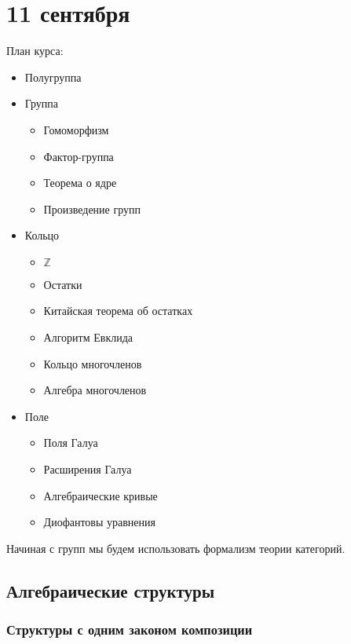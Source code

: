 \chapter{11 сентября}

План курса:
\begin{itemize}
    \item Полугруппа
    \item Группа
          \begin{itemize}
              \item Гомоморфизм
              \item Фактор-группа
              \item Теорема о ядре
              \item Произведение групп
          \end{itemize}
    \item Кольцо
          \begin{itemize}
              \item \(\mathbb{Z}\)
              \item Остатки
              \item Китайская теорема об остатках
              \item Алгоритм Евклида
              \item Кольцо многочленов
              \item Алгебра многочленов
          \end{itemize}
    \item Поле
          \begin{itemize}
              \item Поля Галуа
              \item Расширения Галуа
              \item Алгебраические кривые
              \item Диофантовы уравнения
          \end{itemize}
\end{itemize}

Начиная с групп мы будем использовать формализм теории категорий.

\section{Алгебраические структуры}

\subsection{Структуры с одним законом композиции}

